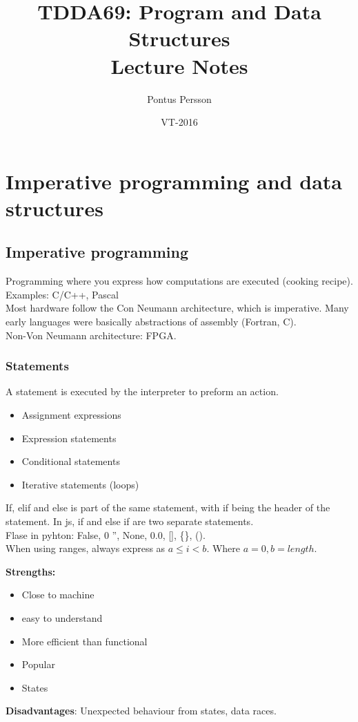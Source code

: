 \documentclass[a4paper]{article}
\title{TDDA69: Program and Data Structures\\Lecture Notes}
\author{Pontus Persson}
\date{VT-2016}
\begin{document}
\maketitle
\tableofcontents
\section{Imperative programming and data structures}
\subsection{Imperative programming}
Programming where you express how computations are executed (cooking recipe).
Examples: C/C++, Pascal\\
Most hardware follow the Con Neumann architecture, which is imperative.
Many early languages were basically abstractions of assembly (Fortran, C).\\
Non-Von Neumann architecture: FPGA.\\
\subsubsection{Statements}
A statement is executed by the interpreter to preform an action.
\begin{itemize}
	\item Assignment expressions
	\item Expression statements
	\item Conditional statements
	\item Iterative statements (loops)
\end{itemize}
If, elif and else is part of the same statement, with if being the header of the
statement. In js, if and else if are two separate statements.\\
Flase in pyhton: False, 0 '', None, 0.0, [], \{\}, ().\\
When using ranges, always express as $a\leq i < b$. Where $a=0,b=length$.

\textbf{Strengths:}
\begin{itemize}
	\item Close to machine 
	\item easy to understand 
	\item More efficient than functional
	\item Popular
	\item States
\end{itemize}
\textbf{Disadvantages}: Unexpected behaviour from states, data races.
\end{document}
